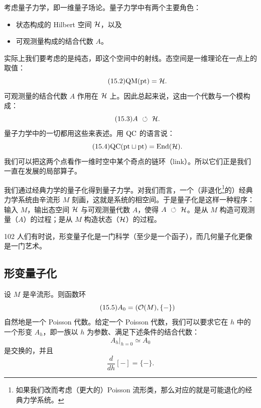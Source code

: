 考虑量子力学，即一维量子场论。量子力学中有两个主要角色：
\begin{itemize}
  \item 状态构成的 Hilbert 空间 $\mathcal{H}$，以及
  \item 可观测量构成的结合代数 $A$。
\end{itemize}
实际上我们要考虑的是纯态，即这个空间中的射线。态空间是一维理论在一点上的取值：
\begin{equation}\tag{15.2}
\mathrm{QM}(\mathrm{pt})=\mathcal{H}.
\end{equation}
可观测量的结合代数 $A$ 作用在 $\mathcal{H}$ 上。因此总起来说，这由一个代数与一个模构成：
\begin{equation}\tag{15.3}
A\ \circlearrowleft\ \mathcal{H}.
\end{equation}
量子力学中的一切都用这些来表述。用 $\mathrm{QC}$ 的语言说：
\begin{equation}\tag{15.4}
\mathrm{QC}(\mathrm{pt}\sqcup\mathrm{pt})=\mathrm{End}(\mathcal{H}).
\end{equation}
我们可以把这两个点看作一维时空中某个奇点的链环（link）。所以它们正是我们一直在发展的局部算子。

我们通过经典力学的量子化得到量子力学。对我们而言，一个（非退化\footnote{如果我们改而考虑（更大的）Poisson 流形类，那么对应的就是可能退化的经典力学系统。}的）经典力学系统由辛流形 $M$ 刻画，这就是系统的相空间。于是量子化是这样一种程序：输入 $M$，输出态空间 $\mathcal{H}$ 与可观测量代数 $A$，使得 $A\ \circlearrowleft\ \mathcal{H}$。是从 $M$ 构造可观测量（$A$）的过程；是从 $M$ 构造状态（$\mathcal{H}$）的过程。

\begin{srcrem}{102}
人们有时说，形变量子化是一门科学（至少是一个函子），而几何量子化更像是一门艺术。
\end{srcrem}

\subsection{形变量子化}

设 $M$ 是辛流形。则函数环
\begin{equation}\tag{15.5}
A_0=(\mathcal{O}(M),\{-\})
\end{equation}
自然地是一个 Poisson 代数。给定一个 Poisson 代数，我们可以要求它在 $h$ 中的一个形变 $A_h$，即一族以 $h$ 为参数、满足下述条件的结合代数：
\begin{equation}\tag{15.6}
A_h|_{h=0}\simeq A_0
\end{equation}
是交换的，并且
\begin{equation}\tag{15.7}
\frac{d}{dh}[-]=\{-\}.
\end{equation}


